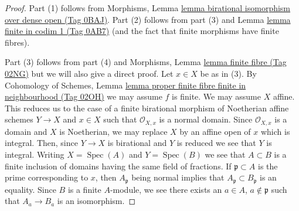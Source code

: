 \documentclass{amsart}
\theoremstyle{plain}
\theoremstyle{definition}
\theoremstyle{remark}
\numberwithin{equation}{subsection}
\def\Spec{\mathop{\mathrm{Spec}}}
\begin{document}
\begin{proof}
Part (1) follows from Morphisms, Lemma
\href{https://stacks.math.columbia.edu/tag/0BAJ}{lemma birational isomorphism over dense open (Tag 0BAJ)}.
Part (2) follows from part (3) and Lemma \href{https://stacks.math.columbia.edu/tag/0AB7}{lemma finite in codim 1 (Tag 0AB7)}
(and the fact that finite morphisms have finite fibres).

\medskip\noindent
Part (3) follows from part (4) and
Morphisms, Lemma \href{https://stacks.math.columbia.edu/tag/02NG}{lemma finite fibre (Tag 02NG)}
but we will also give a direct proof.
Let $x \in X$ be as in (3). By
Cohomology of Schemes, Lemma
\href{https://stacks.math.columbia.edu/tag/02OH}{lemma proper finite fibre finite in neighbourhood (Tag 02OH)}
we may assume $f$ is finite. We may assume $X$ affine.
This reduces us to
the case of a finite birational morphism of Noetherian affine schemes
$Y \to X$ and $x \in X$ such that $\mathcal{O}_{X, x}$ is a
normal domain. Since $\mathcal{O}_{X, x}$ is a domain and $X$
is Noetherian, we may replace $X$ by an affine open of $x$ which
is integral. Then, since $Y \to X$ is birational and $Y$ is reduced
we see that $Y$ is integral. Writing $X = \Spec(A)$ and $Y = \Spec(B)$
we see that $A \subset B$ is a finite inclusion of domains having the same
field of fractions. If $\mathfrak p \subset A$ is the prime corresponding
to $x$, then $A_\mathfrak p$ being normal implies that
$A_\mathfrak p \subset B_\mathfrak p$ is an equality.
Since $B$ is a finite $A$-module, we see there exists an
$a \in A$, $a \not \in \mathfrak p$ such that $A_a \to B_a$
is an isomorphism.


\end{proof}
\end{document}
